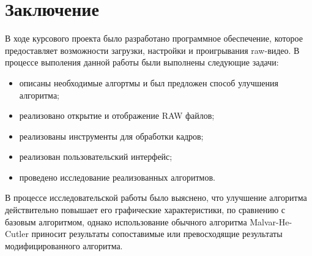 \chapter*{Заключение}

В ходе курсового проекта было разработано программное обеспечение, которое предоставляет возможности загрузки, настройки и проигрывания raw-видео.
В процессе выполения данной работы были выполнены следующие задачи:
\begin{itemize}
	\item описаны необходимые алгортмы и был предложен способ улучшения алгоритма;
	\item реализовано открытие и отображение RAW файлов;
	\item реализованы инструменты для обработки кадров;
	\item реализован пользовательский интерфейс;
	\item проведено исследование реализованных алгоритмов.
\end{itemize}

В процессе исследовательской работы было выяснено, что улучшение алгоритма действительно повышает его графические характеристики, по сравнению с базовым алгоритмом, однако использование обычного алгоритма Malvar-He-Cutler приносит результаты сопоставимые или превосходящие результаты модифицированного алгоритма.
